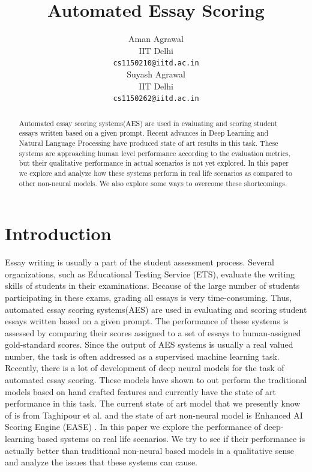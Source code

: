 \documentclass[11pt,a4paper]{article}
\title{Automated Essay Scoring}
\author{Aman Agrawal \\
  IIT Delhi \\
  {\tt cs1150210@iitd.ac.in} \\\And
  Suyash Agrawal \\
  IIT Delhi \\
  {\tt cs1150262@iitd.ac.in} \\}
\date{}
\begin{document}
\maketitle
\begin{abstract}
  Automated essay scoring systems(AES) are used in evaluating and scoring student essays written based on a given prompt. Recent advances in Deep Learning and Natural Language Processing have produced state of art results in this task. These systems are approaching human level performance according to the evaluation metrics, but their qualitative performance in actual scenarios is not yet explored. In this paper we explore and analyze how these systems perform in real life scenarios as compared to other non-neural models. We also explore some ways to overcome these shortcomings.
\end{abstract}

\section{Introduction}

Essay writing is usually a part of the student assessment  process. Several  organizations, such as Educational Testing Service (ETS)\cite{ets}, evaluate the writing skills of students in their examinations. Because of the large number of students participating in these exams, grading all essays is very time-consuming. 
Thus, automated essay scoring systems(AES) are used in evaluating and scoring student essays written based on a given prompt. The performance of these systems is assessed by comparing their scores assigned to a set of essays to human-assigned gold-standard scores.
Since the output of AES systems is usually a real valued number, the task is often addressed as a supervised machine learning task.
Recently, there is a lot of development of deep neural models for the task of automated essay scoring.
These models have shown to out perform the traditional models based on hand crafted features and currently have the state of art performance in this task. The current state of art model that we presently know of is from Taghipour et al. \cite{nea} and the state of art non-neural model is Enhanced AI Scoring Engine (EASE) \cite{ease}.
In this paper we explore the performance of deep-learning based systems on real life scenarios. We try to see if their performance is actually better than traditional non-neural based models in a qualitative sense and analyze the issues that these systems can cause.
\end{document}
